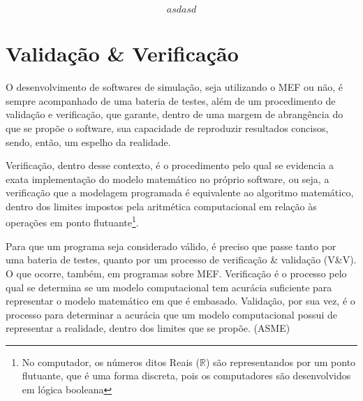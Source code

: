 

$$ asdasd $$
\chapter{Validação \& Verificação}


O desenvolvimento de softwares de simulação, seja utilizando o MEF ou não, é sempre acompanhado de uma bateria de testes, além de um procedimento de validação e verificação, que garante, dentro de uma margem de abrangência do que se propõe o software, sua capacidade de reproduzir resultados concisos, sendo, então, um espelho da realidade. 

Verificação, dentro desse contexto, é o procedimento pelo qual se evidencia a exata implementação do modelo matemático no próprio software, ou seja, a verificação que a modelagem programada é equivalente ao algoritmo matemático, dentro dos limites impostos pela aritmética computacional em relação às operações em ponto flutuante\footnote{No computador, os números ditos Reais ($\mathbb{R}$) são representandos por um ponto flutuante, que é uma forma discreta, pois os computadores são desenvolvidos em lógica booleana}.



Para que um programa seja considerado válido, é preciso que passe tanto por uma bateria de testes, quanto por um processo de verificação \& validação (V\&V). O que ocorre, também, em programas sobre MEF.
Verificação é o processo pelo qual se determina se um modelo computacional tem acurácia suficiente para representar o modelo matemático em que é embasado. Validação, por sua vez, é o processo para determinar a acurácia que um modelo computacional possui de representar a realidade, dentro dos limites que se propõe. (ASME)

